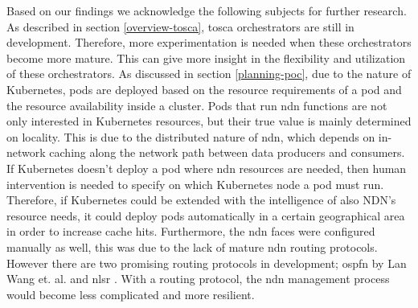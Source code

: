


Based on our findings we acknowledge the following subjects for further research. As described in section \ref{overview-tosca}, \gls{tosca} orchestrators are still in development. Therefore, more experimentation is needed when these orchestrators become more mature. This can give more insight in the flexibility and utilization of these orchestrators. As discussed in section \ref{planning-poc}, due to the nature of Kubernetes, pods are deployed based on the resource requirements of a pod and the resource availability inside a cluster. Pods that run \gls{ndn} functions are not only interested in Kubernetes resources, but their true value is mainly determined on locality. This is due to the distributed nature of \gls{ndn}, which depends on in-network caching along the network path between data producers and consumers. If Kubernetes doesn't deploy a pod where \gls{ndn} resources are needed, then human intervention is needed to specify on which Kubernetes node a pod must run. Therefore, if Kubernetes could be extended with the intelligence of also NDN's resource needs, it could deploy pods automatically in a certain geographical area in order to increase cache hits. Furthermore, the \gls{ndn} faces were configured manually as well, this was due to the lack of mature \gls{ndn} routing protocols. However there are two promising routing protocols in development; \gls{ospfn} by Lan Wang et. al. \cite{ndn-ospfn1, ndn-ospfn2} and \gls{nlsr} \cite{nlsr}. With a routing protocol, the \gls{ndn} management process would become less complicated and more resilient.

